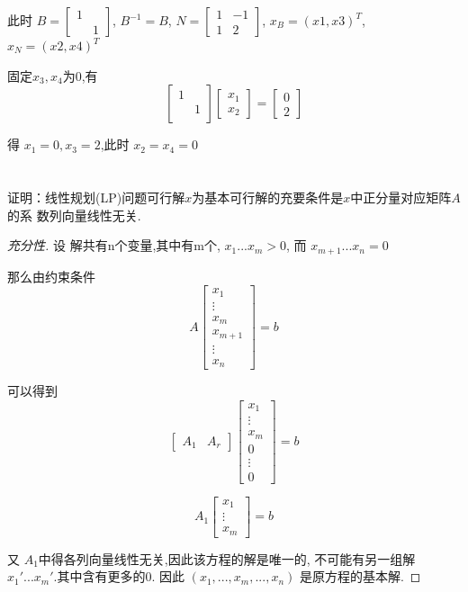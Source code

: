 \documentclass[a4paper]{article}
\begin{document}
此时 $B = \begin{bmatrix}
    1 & \\
      & 1
\end{bmatrix}$, $B^{-1} = B$, $N = \begin{bmatrix}
    1 & -1 \\
    1 & 2
\end{bmatrix}$, $x_B = (x1,x3)^T$, $x_N = (x2,x4)^T$

固定$x_3,x_4$为0,有
\[
\left[\begin{array}{cc}
    1 &  \\
     & 1 \\
\end{array}\right]
\left[\begin{array}{c} x_1 \\ x_2  \end{array}\right] =
\left[\begin{array}{c} 0\\ 2\end{array}\right]
\]

得 $x_1 = 0, x_3 = 2$,此时 $x_2 = x_4 = 0$

\section{}

证明：线性规划(LP)问题可行解$x$为基本可行解的充要条件是$x$中正分量对应矩阵$A$的系
数列向量线性无关.


\begin{proof}[充分性]
设 解共有n个变量,其中有m个, $x_1 ... x_m >0$, 而 $x_{m+1} ... x_n = 0$

那么由约束条件 
\[ A \begin{bmatrix}
    x_1 \\ \vdots \\x_m \\ x_{m+1} \\ \vdots \\ x_n
\end{bmatrix} = b\] 

可以得到
\[ \begin{bmatrix} A_1 & A_{r} \end{bmatrix} \begin{bmatrix}
    x_1 \\ \vdots \\x_m \\ 0 \\ \vdots \\ 0
\end{bmatrix} = b\] 

\[  A_1 \begin{bmatrix}
    x_1 \\ \vdots \\x_m 
\end{bmatrix} = b\] 

又 $A_1$中得各列向量线性无关,因此该方程的解是唯一的, 不可能有另一组解$x_1' ... x_m'$.其中含有更多的0.
因此 $(x_1 ,..., x_m, ... ,x_n)$ 是原方程的基本解.

\end{proof}
\end{document}
